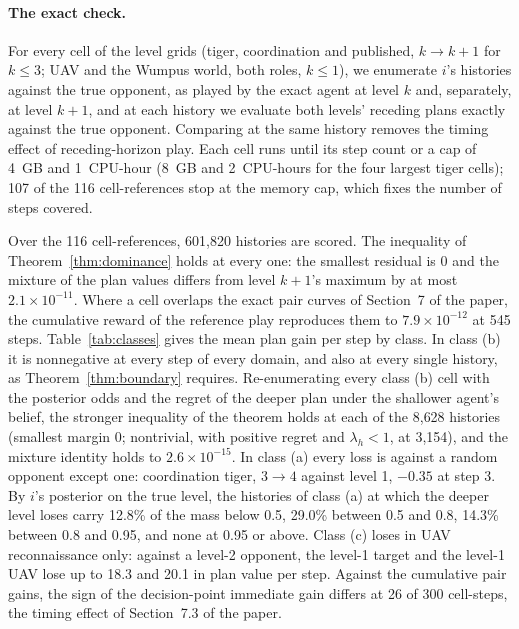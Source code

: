\documentclass{article}
\begin{document}
\paragraph{The exact check.} For every cell of the level grids (tiger, coordination and published, $k \to k+1$ for $k \leq 3$; UAV and the Wumpus world, both roles, $k \leq 1$), we enumerate $i$'s histories against the true opponent, as played by the exact agent at level $k$ and, separately, at level $k+1$, and at each history we evaluate both levels' receding plans exactly against the true opponent. Comparing at the same history removes the timing effect of receding-horizon play. Each cell runs until its step count or a cap of 4~GB and 1~CPU-hour (8~GB and 2~CPU-hours for the four largest tiger cells); 107 of the 116 cell-references stop at the memory cap, which fixes the number of steps covered.

Over the 116 cell-references, 601{,}820 histories are scored. The inequality of Theorem~\ref{thm:dominance} holds at every one: the smallest residual is 0 and the mixture of the plan values differs from level $k+1$'s maximum by at most $2.1 \times 10^{-11}$. Where a cell overlaps the exact pair curves of Section~7 of the paper, the cumulative reward of the reference play reproduces them to $7.9 \times 10^{-12}$ at 545 steps. Table~\ref{tab:classes} gives the mean plan gain per step by class. In class (b) it is nonnegative at every step of every domain, and also at every single history, as Theorem~\ref{thm:boundary} requires. Re-enumerating every class (b) cell with the posterior odds and the regret of the deeper plan under the shallower agent's belief, the stronger inequality of the theorem holds at each of the 8{,}628 histories (smallest margin 0; nontrivial, with positive regret and $\lambda_h < 1$, at 3{,}154), and the mixture identity holds to $2.6 \times 10^{-15}$. In class (a) every loss is against a random opponent except one: coordination tiger, $3 \to 4$ against level 1, $-0.35$ at step 3. By $i$'s posterior on the true level, the histories of class (a) at which the deeper level loses carry 12.8\% of the mass below 0.5, 29.0\% between 0.5 and 0.8, 14.3\% between 0.8 and 0.95, and none at 0.95 or above. Class (c) loses in UAV reconnaissance only: against a level-2 opponent, the level-1 target and the level-1 UAV lose up to 18.3 and 20.1 in plan value per step. Against the cumulative pair gains, the sign of the decision-point immediate gain differs at 26 of 300 cell-steps, the timing effect of Section~7.3 of the paper.
\end{document}
